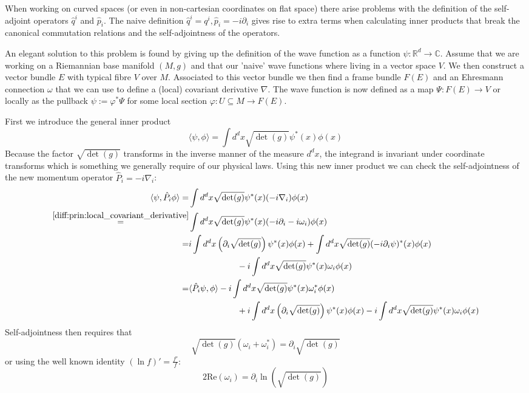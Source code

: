 	\begin{construct}
		When working on curved spaces (or even in non-cartesian coordinates on flat space) there arise problems with the definition of the self-adjoint operators $\hat{q}^i$ and $\hat{p}_i$. The naive definition $\hat{q}^i = q^i, \hat{p}_i = -i\partial_i$ gives rise to extra terms when calculating inner products that break the canonical commutation relations and the self-adjointness of the operators.
	
		An elegant solution to this problem is found by giving up the definition of the wave function as a function $\psi:\mathbb{R}^d\rightarrow\mathbb{C}$. Assume that we are working on a Riemannian base manifold $(M, g)$ and that our 'naive' wave functions where living in a vector space $V$. We then construct a vector bundle $E$ with typical fibre $V$ over $M$. Associated to this vector bundle we then find a frame bundle $F(E)$ and an Ehresmann connection $\omega$ that we can use to define a (local) covariant derivative $\nabla$. The wave function is now defined as a map $\Psi: F(E)\rightarrow V$ or locally as the pullback $\psi := \varphi^*\Psi$ for some local section $\varphi:U\subseteq M\rightarrow F(E)$.
		
		First we introduce the general inner product
		\begin{equation}
			\langle\psi, \phi\rangle = \int d^dx\sqrt{\det(g)}\psi^*(x)\phi(x)
		\end{equation}
		Because the factor $\sqrt{\det(g)}$ transforms in the inverse manner of the measure $d^dx$, the integrand is invariant under coordinate transforms which is something we generally require of our physical laws. Using this new inner product we can check the self-adjointness of the new momentum operator $\hat{P}_i = -i\nabla_i$:
		\begin{align*}
			\langle\psi, \hat{P}_i\phi\rangle = &\int d^dx\sqrt{\det(g)}\psi^*(x)(-i\nabla_i)\phi(x)\\
			\overset{\ref{diff:prin:local_covariant_derivative}}{=} &\int d^dx\sqrt{\det(g)}\psi^*(x)(-i\partial_i - i\omega_i)\phi(x)\\
			= &i\int d^dx\left(\partial_i\sqrt{\det(g)}\right)\psi^*(x)\phi(x) + \int d^dx\sqrt{\det(g)}(-i\partial_i\psi)^*(x)\phi(x)\\
				&\hspace{2cm} -i \int d^dx\sqrt{\det(g)}\psi^*(x)\omega_i\phi(x)\\
			= &\langle\hat{P}_i\psi, \phi\rangle -i \int d^dx\sqrt{\det(g)}\psi^*(x)\omega_i^*\phi(x)\\
				&\hspace{2cm} + i\int d^dx\left(\partial_i\sqrt{\det(g)}\right)\psi^*(x)\phi(x) -i \int d^dx\sqrt{\det(g)}\psi^*(x)\omega_i\phi(x)
		\end{align*}
		Self-adjointness then requires that
		\begin{equation}
			\sqrt{\det(g)}(\omega_i + \omega_i^*) = \partial_i\sqrt{\det(g)}
		\end{equation}
		or using the well known identity $(\ln f)' = \frac{f'}{f}$:
		\begin{equation}
			2\text{Re}(\omega_i) = \partial_i\ln\left(\sqrt{\det(g)}\right)
		\end{equation}
	\end{construct}
